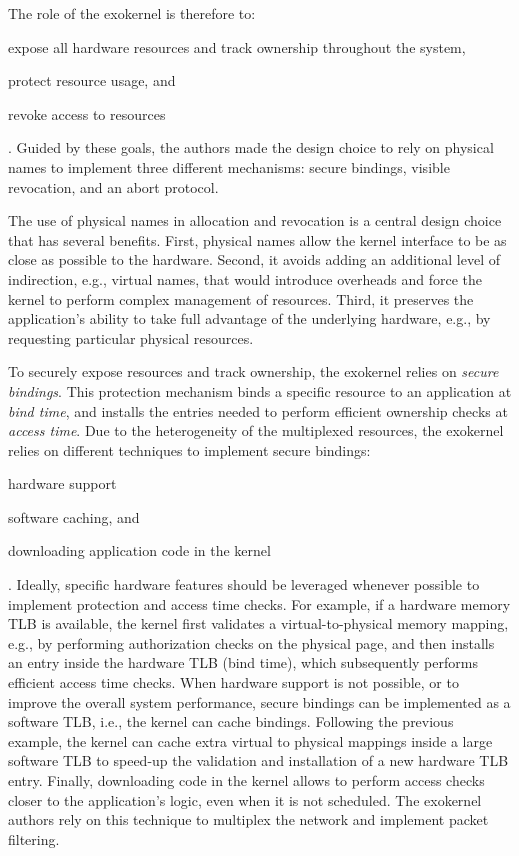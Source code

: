 The role of the exokernel is therefore to:
\begin{enumerate*}
	\item \label{expose} expose all hardware resources and track ownership throughout the system,
	\item \label{protect} protect resource usage, and
	\item \label{revoke} revoke access to resources
\end{enumerate*}.
Guided by these goals, the authors made the design choice to rely on physical names to implement three different mechanisms: secure bindings, visible revocation, and an abort protocol.

The use of physical names in allocation and revocation is a central design choice that has several benefits.
First, physical names allow the kernel interface to be as close as possible to the hardware.
Second, it avoids adding an additional level of indirection, e.g., virtual names, that would introduce overheads and force the kernel to perform complex management of resources.
Third, it preserves the application's ability to take full advantage of the underlying hardware, e.g., by requesting particular physical resources.

To securely expose resources and track ownership, the exokernel relies on \emph{secure bindings}.
This protection mechanism binds a specific resource to an application at \emph{bind time}, and installs the entries needed to perform efficient ownership checks at \emph{access time}.
Due to the heterogeneity of the multiplexed resources, the exokernel relies on different techniques to implement secure bindings:
\begin{enumerate*}
	\item hardware support
	\item software caching, and
	\item downloading application code in the kernel
\end{enumerate*}.
Ideally, specific hardware features should be leveraged whenever possible to implement protection and access time checks.
For example, if a hardware memory TLB is available, the kernel first validates a virtual-to-physical memory mapping, e.g., by performing authorization checks on the physical page, and then installs an entry inside the hardware TLB (bind time), which subsequently performs efficient access time checks.
When hardware support is not possible, or to improve the overall system performance, secure bindings can be implemented as a software TLB, i.e., the kernel can cache bindings.
Following the previous example, the kernel can cache extra virtual to physical mappings inside a large software TLB to speed-up the validation and installation of a new hardware TLB entry.
Finally, downloading code in the kernel allows to perform access checks closer to the application's logic, even when it is not scheduled.
The exokernel authors rely on this technique to multiplex the network and implement packet filtering.

